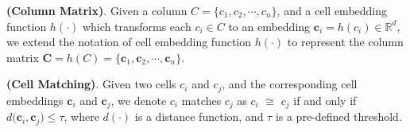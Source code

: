 \begin{myDef}
\label{def: colmat}
    \textnormal{\textbf{(Column Matrix)}.}  Given a column $C= \{c_1, c_2,  \cdots, c_n\}$, and a cell embedding function $h(\cdot)$ which transforms each $c_i \in C$ to an embedding $\mathbf{c}_i = h(c_i) \in \mathbb{R}^d$,  we extend the notation of cell embedding function $h(\cdot)$ to represent the column matrix $\mathbf{C} = h(C) = \{\mathbf{c}_1, \mathbf{c}_2, \cdots, \mathbf{c}_n\}$.
\end{myDef}

\begin{myDef}
\label{def:cellmatch}
    \textnormal{\textbf{(Cell Matching)}.} Given two cells $c_i$ and $c_j$, and the corresponding cell embeddings $\mathbf{c}_i$ and $\mathbf{c}_j$,  we denote $c_i$ matches $c_j$ as  
    $c_i$ $\cong$ $c_j$ if and only if $ d\big(\mathbf{c}_i, \mathbf{c}_j\big) \leq \tau $, where $d(\cdot)$ is a distance function, and $\tau$ is a pre-defined threshold.
\end{myDef}




 



